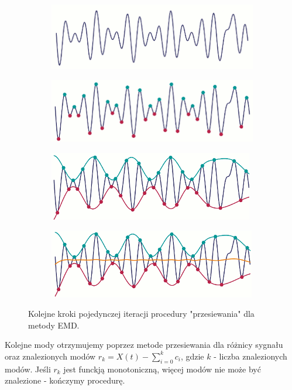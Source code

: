 \begin{figure} [H]
	\centering
	\begin{subfigure}{.48\textwidth}
		\centering
		\includegraphics[width=1.0\linewidth]{EDMIIssues/Figures/emd1.png}
	\end{subfigure}
	\begin{subfigure}{.48\textwidth}
		\centering
		\includegraphics[width=1.0\linewidth]{EDMIIssues/Figures/emd2.png}
	\end{subfigure}
	\begin{subfigure}{.48\textwidth}
		\centering
		\includegraphics[width=1.0\linewidth]{EDMIIssues/Figures/emd3.png}
	\end{subfigure}
	\begin{subfigure}{.48\textwidth}
		\centering
		\includegraphics[width=1.0\linewidth]{EDMIIssues/Figures/emd4.png}
	\end{subfigure}
	\caption{Kolejne kroki pojedynczej iteracji procedury "przesiewania" dla metody EMD.}
	\label{emd}
\end{figure}

Kolejne mody otrzymujemy poprzez metode przesiewania dla różnicy sygnału oraz znalezionych modów $ r_{k} = X(t) - \sum_{i=0}^{k} c_i $, gdzie $ k $ - liczba znalezionych modów. Jeśli $ r_k $ jest funckją monotoniczną, więcej modów nie może być znalezione - kończymy procedurę.